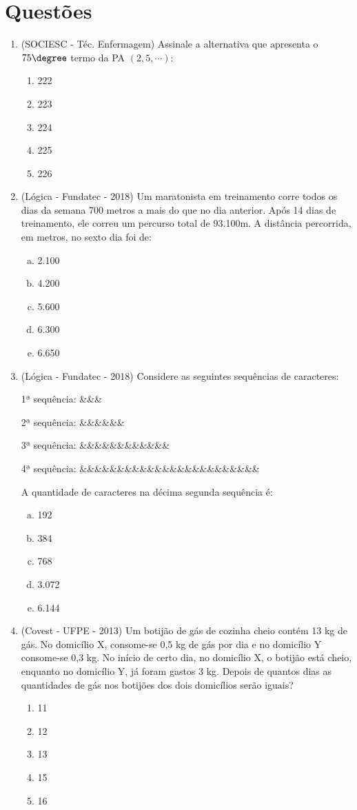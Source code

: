 
\section{Questões}
\begin{enumerate}
 \item (SOCIESC - Téc. Enfermagem) Assinale a alternativa que apresenta o $75\degree$ termo da PA $(2, 5, \cdots)$:
  \begin{enumerate}
  \item 222
  \item 223
  \item 224
  \item 225
  \item 226
 \end{enumerate}
 
 \item (Lógica - Fundatec - 2018) Um maratonista em treinamento corre todos os dias da semana 700 metros a mais do que no dia anterior. Após 14 dias de treinamento, ele correu um percurso total de 93.100m. A distância percorrida, em metros, no sexto dia foi de:

\begin{enumerate}[a)]
\item 2.100
\item 4.200
\item 5.600
\item 6.300
\item 6.650
\end{enumerate}


\item (Lógica - Fundatec - 2018) Considere as seguintes sequências de caracteres:

1ª sequência: \&\&\&

2ª sequência: \&\&\&\&\&\&

3ª sequência: \&\&\&\&\&\&\&\&\&\&\&\&

4ª sequência: \&\&\&\&\&\&\&\&\&\&\&\&\&\&\&\&\&\&\&\&\&\&\&\&

A quantidade de caracteres na décima segunda sequência é:

\begin{enumerate}[a)]
\item 192
\item 384
\item 768
\item 3.072
\item 6.144
\end{enumerate}


\item (Covest - UFPE - 2013) Um botijão de gás de cozinha cheio contém 13 kg de gás. No domicílio X, consome-se 0,5 kg de gás por dia e no domicílio Y consome-se 0,3 kg. No início de certo dia, no domicílio X, o botijão está cheio, enquanto no domicílio Y, já foram gastos 3 kg. Depois de quantos dias as quantidades de gás nos botijões dos dois domicílios serão iguais? 
\begin{enumerate}
\item 11
\item 12
\item 13
\item 15
\item 16
\end{enumerate}


\end{enumerate}
